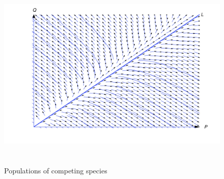 \documentclass{ximera}
\begin{document}
\begin{figure}[h]
  \centering
  \includegraphics[bb=-78 148 689 643,width=5.67in,height=3.66in,keepaspectratio]{fig010103}
\color{blue}
  \caption{ Populations of competing species}
  \label{figure:1.1.3}
\end{figure}
\end{document}
